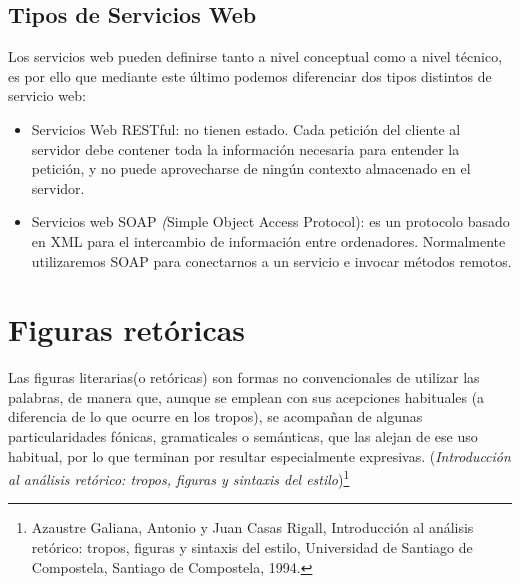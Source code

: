\subsection{Tipos de Servicios Web}

Los servicios web pueden definirse tanto a nivel conceptual como a nivel técnico, es por ello que mediante este último podemos diferenciar dos tipos distintos de servicio web:
\begin{itemize}
	\item Servicios Web RESTful: no tienen estado. Cada petición del cliente al servidor debe contener toda la información necesaria para entender la petición, y no puede aprovecharse de ningún contexto almacenado en el servidor.
	\item Servicios web SOAP  \textit({Simple Object Access Protocol}): es un protocolo basado en XML para el intercambio de información entre ordenadores. Normalmente utilizaremos SOAP para conectarnos a un servicio e invocar métodos remotos.
\end{itemize}


\section{Figuras retóricas}

 Las figuras literarias(o retóricas) son formas no convencionales de utilizar las palabras, de manera que, aunque se emplean con sus acepciones habituales (a diferencia de lo que ocurre en los tropos), se acompañan de algunas particularidades fónicas, gramaticales o semánticas, que las alejan de ese uso habitual, por lo que terminan por resultar especialmente expresivas. (\textit {Introducción al análisis retórico: tropos, figuras y sintaxis del estilo})\footnote{Azaustre Galiana, Antonio y Juan Casas Rigall, Introducción al análisis retórico: tropos, figuras y sintaxis del estilo, Universidad de Santiago de Compostela, Santiago de Compostela, 1994.}

